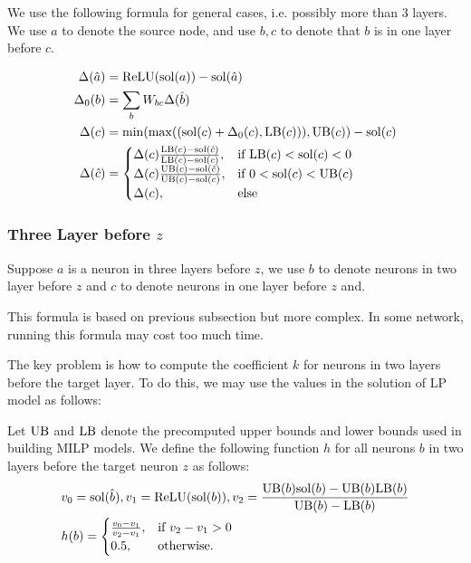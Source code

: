 \iffalse
We use the following formula for general cases, i.e. possibly more than 3 layers. We use $a$ to denote the source node, and use $b,c$ to denote that $b$ is in one layer before $c$. 

\begin{align*}
	\Delta(\hat{a}) &= \mathrm{ReLU}(\mathrm{sol}(a))-\mathrm{sol}(\hat{a})\\
	\Delta_0(b) &= \sum_{b} W_{bc}\Delta(\hat{b})\\
		\Delta(c) &= \min(\max((\mathrm{sol}(c)+\Delta_0(c),\mathrm{LB}(c))),\mathrm{UB}(c))-\mathrm{sol}(c)\\
		\Delta(\hat{c}) &=
		\begin{cases}
		\Delta(c)\frac{\mathrm{LB}(c) - \mathrm{sol}(\hat{c})}{\mathrm{LB}(c) - \mathrm{sol}(c)},  &\text{if } \mathrm{LB}(c)< \mathrm{sol}(c) < 0\\
		\Delta(c)\frac{\mathrm{UB}(c) - \mathrm{sol}(\hat{c})}{\mathrm{UB}(c) - \mathrm{sol}(c)},  &\text{if }  0< \mathrm{sol}(c) < \mathrm{UB}(c)\\
			\Delta(c),  &\text{else } 	 
		\end{cases}
\end{align*}


\subsubsection*{Three Layer before  $z$} 

Suppose $a$ is a neuron in three layers before $z$, we use $b$ to denote neurons in two layer before $z$ and $c$ to denote neurons in one layer before $z$ and. 

This formula is based on previous subsection but more complex. In some network, running this formula may cost too much time. 

The key problem is how to compute the coefficient $k$ for neurons in two layers before the target layer. To do this, we may use the values in the solution of LP model as follows:

\begin{definition}\label{3layer}
Let $\mathrm{UB}$ and $\mathrm{LB}$ denote the precomputed upper bounds and lower bounds used in building MILP models. We define the following function $h$ for all neurons $b$ in two layers before the target neuron $z$ as follows:
	\begin{align}
		&v_0 = \mathrm{sol}(\hat{b}), v_1 = \mathrm{ReLU}(\mathrm{sol}(b)), v_2 = \frac{\mathrm{UB}(b)\mathrm{sol}(b)-\mathrm{UB}(b)\mathrm{LB}(b)}{\mathrm{UB}(b)-\mathrm{LB}(b)}\\
		&h(b) =
		\begin{cases}
			\frac{v_0-v_1}{v_2-v_1}, & \text{if } v_2-v_1 > 0\\
			0.5, & \text{otherwise.}
		\end{cases}
	\end{align} 
\end{definition} 

